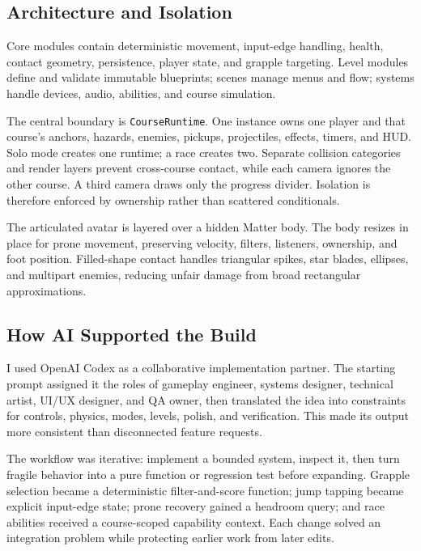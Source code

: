 \documentclass[11pt,letterpaper]{article}
\begin{document}
\subsection{Architecture and Isolation}

Core modules contain deterministic movement, input-edge handling, health, contact geometry, persistence, player state, and grapple targeting. Level modules define and validate immutable blueprints; scenes manage menus and flow; systems handle devices, audio, abilities, and course simulation.

The central boundary is \texttt{CourseRuntime}. One instance owns one player and that course's anchors, hazards, enemies, pickups, projectiles, effects, timers, and HUD. Solo mode creates one runtime; a race creates two. Separate collision categories and render layers prevent cross-course contact, while each camera ignores the other course. A third camera draws only the progress divider. Isolation is therefore enforced by ownership rather than scattered conditionals.

The articulated avatar is layered over a hidden Matter body. The body resizes in place for prone movement, preserving velocity, filters, listeners, ownership, and foot position. Filled-shape contact handles triangular spikes, star blades, ellipses, and multipart enemies, reducing unfair damage from broad rectangular approximations.

\subsection{How AI Supported the Build}

I used OpenAI Codex as a collaborative implementation partner. The starting prompt assigned it the roles of gameplay engineer, systems designer, technical artist, UI/UX designer, and QA owner, then translated the idea into constraints for controls, physics, modes, levels, polish, and verification. This made its output more consistent than disconnected feature requests.

The workflow was iterative: implement a bounded system, inspect it, then turn fragile behavior into a pure function or regression test before expanding. Grapple selection became a deterministic filter-and-score function; jump tapping became explicit input-edge state; prone recovery gained a headroom query; and race abilities received a course-scoped capability context. Each change solved an integration problem while protecting earlier work from later edits.
\end{document}

